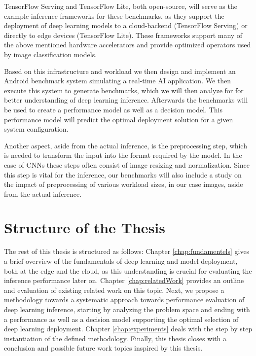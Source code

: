 TensorFlow Serving and TensorFlow Lite, both open-source, will serve as the example inference frameworks for these benchmarks, as they support the deployment of deep learning models to a cloud-backend (TensorFlow Serving) or directly to edge devices (TensorFlow Lite). These frameworks support many of the above mentioned hardware accelerators and provide optimized operators used by image classification models.

Based on this infrastructure and workload we then design and implement an Android benchmark system simulating a real-time AI application.
We then execute this system to generate benchmarks, which we will then analyze for for better understanding of deep learning inference. Afterwards the benchmarks will be used to create a performance model as well as a decision model.
This performance model will predict the optimal deployment solution for a given system configuration.

Another aspect, aside from the actual inference, is the preprocessing step, which is needed to transform the input into the format required by the model. 
In the case of CNNs these steps often consist of image resizing and normalization.
Since this step is vital for the inference, our benchmarks will also include a study on the impact of preprocessing of various workload sizes, in our case images, aside from the actual inference.

\section{Structure of the Thesis}
The rest of this thesis is structured as follows: 
Chapter \ref{chap:fundamentels} gives a brief overview of the fundamentals of deep learning and model deployment, both at the edge and the cloud, as this understanding is crucial for evaluating the inference performance later on.
Chapter \ref{chap:relatedWork} provides an outline and evaluation of existing related work on this topic. 
Next, we propose a methodology towards a systematic approach towards performance evaluation of deep learning inference, starting by analyzing the problem space and ending with a performance as well as a decision model supporting the optimal selection of deep learning deployment.
Chapter \ref{chap:experiments} deals with the step by step instantiation of the defined methodology.
Finally, this thesis closes with a conclusion and possible future work topics inspired by this thesis.
